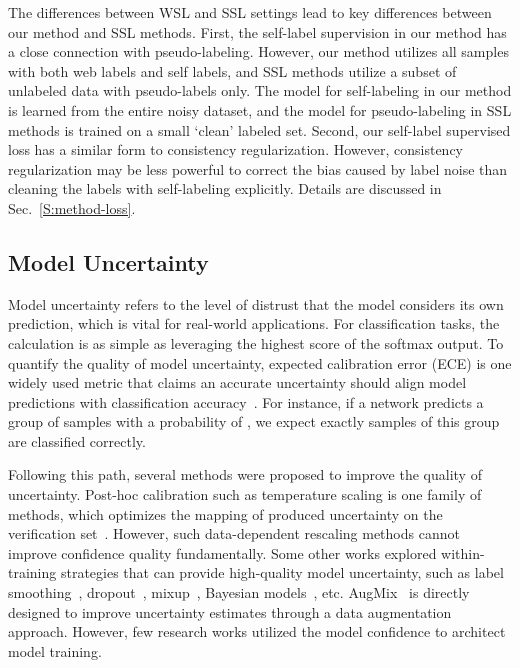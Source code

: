 \documentclass[runningheads]{llncs}
\begin{document}
The differences between WSL and SSL settings lead to key differences between our method and SSL methods. First, the self-label supervision in our method has a close connection with pseudo-labeling. However, our method utilizes all samples with both web labels and self labels, and SSL methods utilize a subset of unlabeled data with pseudo-labels only. The model for self-labeling in our method is learned from the entire noisy dataset, and the model for pseudo-labeling in SSL methods is trained on a small `clean' labeled set. Second, our self-label supervised loss has a similar form to consistency regularization. However, consistency regularization may be less powerful to correct the bias caused by label noise than cleaning the labels with self-labeling explicitly.
Details are discussed in Sec.~\ref{S:method-loss}.
	
\subsection{Model Uncertainty}
Model uncertainty refers to the level of distrust that the model considers its own prediction, which is vital for real-world applications. For classification tasks, the calculation is as simple as leveraging the highest score of the softmax output. To quantify the quality of model uncertainty, expected calibration error (ECE) is one widely used metric that claims an accurate uncertainty should align model predictions with classification accuracy~\cite{guo2017calibration,ovadia2019can}. For instance, if a network predicts a group of samples with a probability of , we expect exactly  samples of this group are classified correctly.

Following this path, several methods were proposed to improve the quality of uncertainty. Post-hoc calibration such as temperature scaling is one family of methods, which optimizes the mapping of produced uncertainty on the verification set~\cite{guo2017calibration}. However, such data-dependent rescaling methods cannot improve confidence quality fundamentally. Some other works explored within-training strategies that can provide high-quality model uncertainty, such as label smoothing~\cite{muller2019does}, dropout~\cite{gal2016dropout}, mixup~\cite{thulasidasan2019mixup}, Bayesian models~\cite{lakshminarayanan2017simple}, etc. AugMix~\cite{hendrycks2020augmix} is directly designed to improve uncertainty estimates through a data augmentation approach. However, few research works utilized the model confidence to architect model training.
\end{document}
